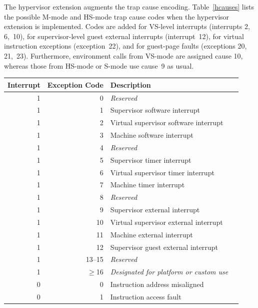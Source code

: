 The hypervisor extension augments the trap cause encoding.
Table~\ref{hcauses} lists the possible M-mode and HS-mode trap cause
codes when the hypervisor extension is implemented.
Codes are added for VS-level interrupts (interrupts 2, 6,~10), for
supervisor-level guest external interrupts (interrupt~12), for virtual
instruction exceptions (exception~22), and for guest-page faults
(exceptions 20, 21,~23).
Furthermore, environment calls from VS-mode are assigned cause 10,
whereas those from HS-mode or S-mode use cause~9 as usual.

\begin{table}[p]
\begin{center}
\begin{tabular}{|r|r|l|l|}
  \hline
  Interrupt & Exception Code  & Description \\
  \hline
  1         & 0               & {\em Reserved} \\
  1         & 1               & Supervisor software interrupt \\
  1         & 2               & Virtual supervisor software interrupt \\
  1         & 3               & Machine software interrupt \\ \hline
  1         & 4               & {\em Reserved} \\
  1         & 5               & Supervisor timer interrupt \\
  1         & 6               & Virtual supervisor timer interrupt \\
  1         & 7               & Machine timer interrupt \\ \hline
  1         & 8               & {\em Reserved} \\
  1         & 9               & Supervisor external interrupt \\
  1         & 10              & Virtual supervisor external interrupt \\
  1         & 11              & Machine external interrupt \\ \hline
  1         & 12              & Supervisor guest external interrupt \\
  1         & 13--15          & {\em Reserved} \\
  1         & $\ge$16         & {\em Designated for platform or custom use} \\ \hline
  0         & 0               & Instruction address misaligned \\
  0         & 1               & Instruction access fault \\

\end{tabular}
\end{center}
\end{table}

